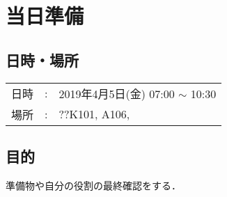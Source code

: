 
%
\section{当日準備}


\subsection{日時・場所}
\begin{tabular}{p{}rp{}}
  日時 & : & 2019年4月5日(金) 07:00 $\sim$ 10:30\\ %
  場所 & : & ??K101, A106,                                        %
\end{tabular}


\subsection{目的}
準備物や自分の役割の最終確認をする．


